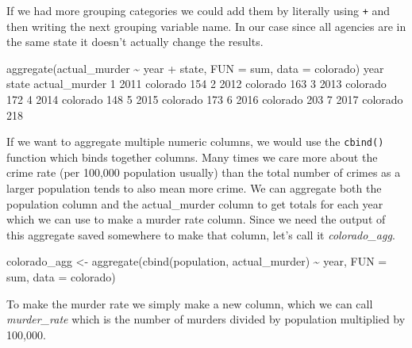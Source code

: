 \documentclass[
]{krantz}
\makeatletter
\newenvironment{Shaded}{\begin{snugshade}}{\end{snugshade}}
\newcommand{\AttributeTok}[1]{\textcolor[rgb]{0.61,0.61,0.61}{#1}}
\newcommand{\DecValTok}[1]{\textcolor[rgb]{0.06,0.06,0.06}{#1}}
\newcommand{\FunctionTok}[1]{\textcolor[rgb]{0,0,0}{#1}}
\newcommand{\NormalTok}[1]{#1}
\newcommand{\OtherTok}[1]{\textcolor[rgb]{0.37,0.37,0.37}{#1}}
\newcommand{\SpecialCharTok}[1]{\textcolor[rgb]{0,0,0}{#1}}
\newenvironment{kframe}{%
\medskip{}
\setlength{\fboxsep}{.8em}
 \def\at@end@of@kframe{}%
 \ifinner\ifhmode%
  \def\at@end@of@kframe{\end{minipage}}%
  \begin{minipage}{\columnwidth}%
 \fi\fi%
 \def\FrameCommand##1{\hskip\@totalleftmargin \hskip-\fboxsep
 \colorbox{shadecolor}{##1}\hskip-\fboxsep
     \hskip-\linewidth \hskip-\@totalleftmargin \hskip\columnwidth}%
 \MakeFramed {\advance\hsize-\width
   \@totalleftmargin\z@ \linewidth\hsize
   \@setminipage}}%
 {\par\unskip\endMakeFramed%
 \at@end@of@kframe}
\renewenvironment{Shaded}{\begin{kframe}}{\end{kframe}}
\makeatother
\begin{document}
If we had more grouping categories we could add them by literally using \texttt{+} and then writing the next grouping variable name. In our case since all agencies are in the same state it doesn't actually change the results.

\begin{Shaded}
\begin{Highlighting}[]
\FunctionTok{aggregate}\NormalTok{(actual\_murder }\SpecialCharTok{\textasciitilde{}}\NormalTok{ year }\SpecialCharTok{+}\NormalTok{ state, }\AttributeTok{FUN =}\NormalTok{ sum, }\AttributeTok{data =}\NormalTok{ colorado)}
\NormalTok{  year    state actual\_murder}
\DecValTok{1} \DecValTok{2011}\NormalTok{ colorado           }\DecValTok{154}
\DecValTok{2} \DecValTok{2012}\NormalTok{ colorado           }\DecValTok{163}
\DecValTok{3} \DecValTok{2013}\NormalTok{ colorado           }\DecValTok{172}
\DecValTok{4} \DecValTok{2014}\NormalTok{ colorado           }\DecValTok{148}
\DecValTok{5} \DecValTok{2015}\NormalTok{ colorado           }\DecValTok{173}
\DecValTok{6} \DecValTok{2016}\NormalTok{ colorado           }\DecValTok{203}
\DecValTok{7} \DecValTok{2017}\NormalTok{ colorado           }\DecValTok{218}
\end{Highlighting}
\end{Shaded}

If we want to aggregate multiple numeric columns, we would use the \texttt{cbind()} function which binds together columns. Many times we care more about the crime rate (per 100,000 population usually) than the total number of crimes as a larger population tends to also mean more crime. We can aggregate both the population column and the actual\_murder column to get totals for each year which we can use to make a murder rate column. Since we need the output of this aggregate saved somewhere to make that column, let's call it \emph{colorado\_agg}.

\begin{Shaded}
\begin{Highlighting}[]
\NormalTok{colorado\_agg }\OtherTok{\textless{}{-}} \FunctionTok{aggregate}\NormalTok{(}\FunctionTok{cbind}\NormalTok{(population, actual\_murder) }\SpecialCharTok{\textasciitilde{}}
\NormalTok{  year, }\AttributeTok{FUN =}\NormalTok{ sum, }\AttributeTok{data =}\NormalTok{ colorado)}
\end{Highlighting}
\end{Shaded}

To make the murder rate we simply make a new column, which we can call \emph{murder\_rate} which is the number of murders divided by population multiplied by 100,000.
\end{document}
